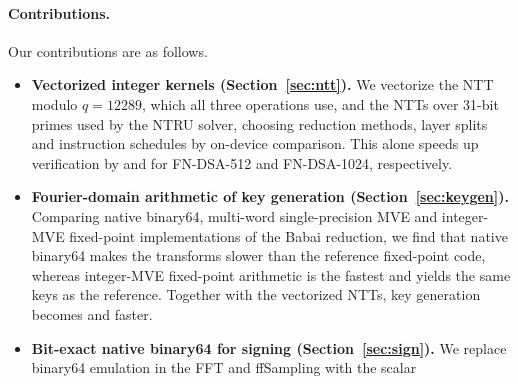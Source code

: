 \paragraph{Contributions.}
Our contributions are as follows.
\begin{itemize}
  \item \textbf{Vectorized integer kernels (Section~\ref{sec:ntt}).}
    We vectorize the NTT modulo $q=12289$, which all three operations use,
    and the NTTs over 31-bit primes used by the NTRU solver, choosing
    reduction methods, layer splits and instruction schedules by on-device
    comparison.
    This alone speeds up verification by  and
     for FN-DSA-512 and FN-DSA-1024, respectively.
  \item \textbf{Fourier-domain arithmetic of key generation
    (Section~\ref{sec:keygen}).}
    Comparing native binary64, multi-word single-precision MVE and
    integer-MVE fixed-point implementations of the Babai reduction, we find
    that native binary64 makes the transforms  slower
    than the reference fixed-point code, whereas integer-MVE fixed-point
    arithmetic is the fastest and yields the same keys as the reference.
    Together with the vectorized NTTs, key generation becomes
     and  faster.
  \item \textbf{Bit-exact native binary64 for signing
    (Section~\ref{sec:sign}).}
    We replace binary64 emulation in the FFT and ffSampling with the scalar

\end{itemize}
